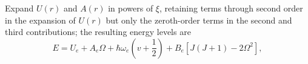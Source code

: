 Expand $U(r)$ and $A(r)$ in powers of $\xi$, retaining terms through second order in the expansion of $U(r)$ but only the zeroth-order terms in the second and third contributions; the resulting energy levels are
\begin{equation}E=U_e+A_e\Omega+\hbar\omega_e\left(v+\frac12\right)+B_e[J(J+1)-2\Omega^2],\tag{83.7}\end{equation}
